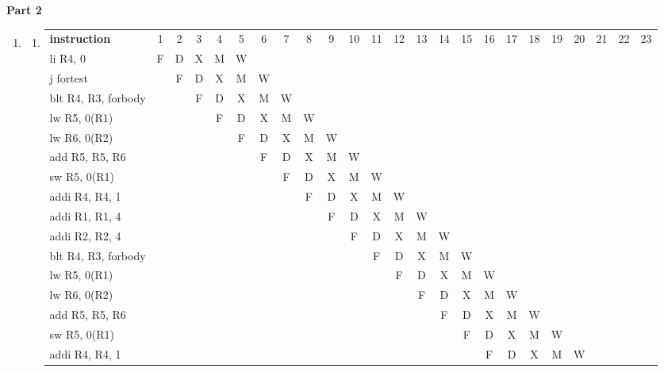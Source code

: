 \documentclass[12pt,a4]{article}
\begin{document}
\textbf{Part 2}
\begin{enumerate}
  \item
    \begin{enumerate}
      \item
        \begin{adjustbox}{angle=-90, center}
          \begin{tabular}{l c c c c c c c c c c c c c c c c c c c c c c c}
            \textbf{instruction}& 1 & 2 & 3 & 4 & 5 & 6 & 7 & 8 & 9 & 10 & 11 & 12 & 13 & 14 & 15 & 16 & 17 & 18 & 19 & 20 & 21 & 22 & 23\\
            li  R4, 0           & F & D & X & M & W &   &   &   \\
            j   fortest         &   & F & D & X & M & W &   &   \\
            blt R4, R3, forbody &   &   & F & D & X & M & W &   \\
            lw R5, 0(R1)        &   &   &   & F & D & X & M & W \\
            lw R6, 0(R2)        &   &   &   &   & F & D & X & M & W \\
            add R5, R5, R6      &   &   &   &   &   & F & D & X & M & W \\
            sw R5, 0(R1)        &   &   &   &   &   &   & F & D & X & M & W \\
            addi R4, R4, 1      &   &   &   &   &   &   &   & F & D & X & M & W \\
            addi R1, R1, 4      &   &   &   &   &   &   &   &   & F & D & X & M & W \\
            addi R2, R2, 4      &   &   &   &   &   &   &   &   &   & F & D & X & M & W \\
            blt R4, R3, forbody &   &   &   &   &   &   &   &   &   &   & F & D & X & M & W &  \\
            lw R5, 0(R1)        &   &   &   &   &   &   &   &   &   &   &   & F & D & X & M & W \\
            lw R6, 0(R2)        &   &   &   &   &   &   &   &   &   &   &   &   & F & D & X & M & W \\
            add R5, R5, R6      &   &   &   &   &   &   &   &   &   &   &   &   &   & F & D & X & M & W \\
            sw R5, 0(R1)        &   &   &   &   &   &   &   &   &   &   &   &   &   &   & F & D & X & M & W \\
            addi R4, R4, 1      &   &   &   &   &   &   &   &   &   &   &   &   &   &   &   & F & D & X & M & W \\

\end{tabular}
\end{adjustbox}
\end{enumerate}
\end{enumerate}
\end{document}
